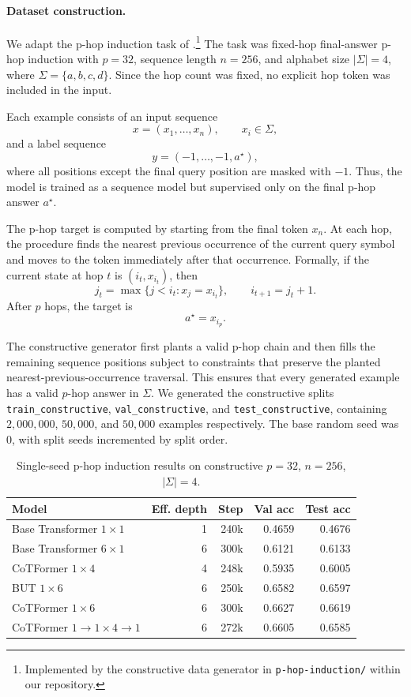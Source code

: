 \documentclass[10pt]{article}
\begin{document}
\paragraph{Dataset construction.}
We adapt the p-hop induction task of \citet{saunshi2025reasoning}.\footnote{Implemented by the constructive data generator in \texttt{p-hop-induction/} within our repository.}
The task was fixed-hop final-answer p-hop induction with \(p=32\), sequence
length \(n=256\), and alphabet size \(|\Sigma|=4\), where
\(\Sigma=\{a,b,c,d\}\). Since the hop count was fixed, no explicit hop token was
included in the input.

Each example consists of an input sequence
\[
    x = (x_1,\ldots,x_n), \qquad x_i \in \Sigma,
\]
and a label sequence
\[
    y = (-1,\ldots,-1,a^\star),
\]
where all positions except the final query position are masked with
\(-1\). Thus, the model is trained as a sequence model but supervised only on
the final p-hop answer \(a^\star\).

The p-hop target is computed by starting from the final token \(x_n\). At each
hop, the procedure finds the nearest previous occurrence of the current query
symbol and moves to the token immediately after that occurrence. Formally, if
the current state at hop \(t\) is \((i_t, x_{i_t})\), then
\[
    j_t = \max\{j < i_t : x_j = x_{i_t}\},
    \qquad
    i_{t+1}=j_t+1.
\]
After \(p\) hops, the target is
\[
    a^\star = x_{i_p}.
\]

The constructive generator first plants a valid
p-hop chain and then fills the remaining sequence positions subject to
constraints that preserve the planted nearest-previous-occurrence traversal.
This ensures that every generated example has a valid \(p\)-hop answer in
\(\Sigma\). We generated the constructive splits
\texttt{train\_constructive}, \texttt{val\_constructive}, and
\texttt{test\_constructive}, containing \(2{,}000{,}000\), \(50{,}000\), and
\(50{,}000\) examples respectively. The base random seed was \(0\), with split
seeds incremented by split order.
\begin{table}[!ht]
\centering
\small
\begin{tabular}{lrrrr}
\toprule
Model & Eff. depth & Step & Val acc & Test acc \\
\midrule
Base Transformer \(1{\times}1\)        & 1 & 240k & 0.4659 & 0.4676 \\
Base Transformer \(6{\times}1\)        & 6 & 300k & 0.6121 & 0.6133 \\
CoTFormer \(1{\times}4\)               & 4 & 248k & 0.5935 & 0.6005 \\
BUT \(1{\times}6\)                     & 6 & 250k & 0.6582 & 0.6597 \\
CoTFormer \(1{\times}6\)               & 6 & 300k & 0.6627 & 0.6619 \\
CoTFormer \(1 \to 1{\times}4 \to 1\)   & 6 & 272k & 0.6605 & 0.6585 \\
\bottomrule
\end{tabular}
\caption{Single-seed p-hop induction results on constructive \(p=32\), \(n=256\), \(|\Sigma|=4\).}
\label{tab:phop_results}
\end{table}
\end{document}

